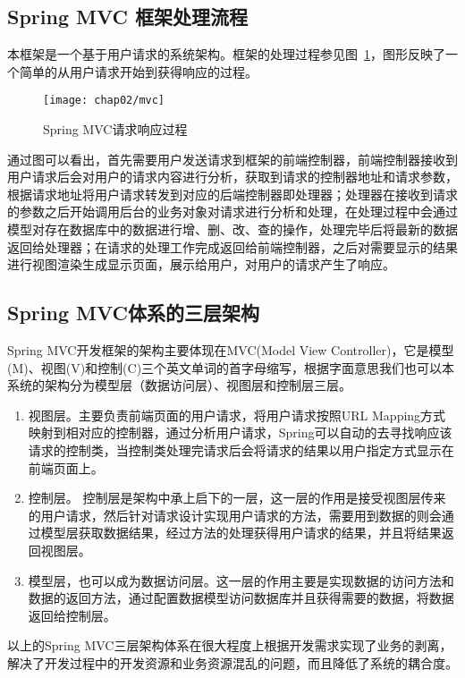 \subsection{Spring MVC 框架处理流程}
本框架是一个基于用户请求的系统架构。框架的处理过程参见图~\ref{fig:mvc}，图形反映了一个简单的从用户请求开始到获得响应的过程。
\begin{figure}[H] %
  \centering
  \texttt{[image: chap02/mvc]}
  \caption{Spring MVC请求响应过程}
  \label{fig:mvc}
\end{figure}
通过图可以看出，首先需要用户发送请求到框架的前端控制器，前端控制器接收到用户请求后会对用户的请求内容进行分析，获取到请求的控制器地址和请求参数，根据请求地址将用户请求转发到对应的后端控制器即处理器；处理器在接收到请求的参数之后开始调用后台的业务对象对请求进行分析和处理，在处理过程中会通过模型对存在数据库中的数据进行增、删、改、查的操作，处理完毕后将最新的数据返回给处理器；在请求的处理工作完成返回给前端控制器，之后对需要显示的结果进行视图渲染生成显示页面，展示给用户，对用户的请求产生了响应\cite{李守振2006web}。
\subsection{Spring MVC体系的三层架构}
Spring MVC开发框架的架构主要体现在MVC(Model View Controller)，它是模型(M)、视图(V)和控制(C)三个英文单词的首字母缩写，根据字面意思我们也可以本系统的架构分为模型层（数据访问层）、视图层和控制层三层。

\begin{enumerate}
\item 视图层。主要负责前端页面的用户请求，将用户请求按照URL Mapping方式映射到相对应的控制器，通过分析用户请求，Spring可以自动的去寻找响应该请求的控制类，当控制类处理完请求后会将请求的结果以用户指定方式显示在前端页面上。

\item 控制层。 控制层是架构中承上启下的一层，这一层的作用是接受视图层传来的用户请求，然后针对请求设计实现用户请求的方法，需要用到数据的则会通过模型层获取数据结果，经过方法的处理获得用户请求的结果，并且将结果返回视图层。

\item 模型层，也可以成为数据访问层。这一层的作用主要是实现数据的访问方法和数据的返回方法，通过配置数据模型访问数据库并且获得需要的数据，将数据返回给控制层。
\end{enumerate}
以上的Spring MVC三层架构体系在很大程度上根据开发需求实现了业务的剥离，解决了开发过程中的开发资源和业务资源混乱的问题，而且降低了系统的耦合度。

